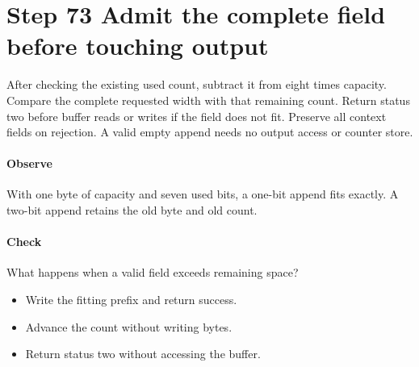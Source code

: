 \section{Step 73 Admit the complete field before touching output}\label{h263-writer-s03}
After checking the existing used count, subtract it from eight times capacity.
Compare the complete requested width with that remaining count. Return status
two before buffer reads or writes if the field does not fit. Preserve all context
fields on rejection. A valid empty append needs no output access or counter store.

\paragraph{Observe} With one byte of capacity and seven used bits, a one-bit
append fits exactly. A two-bit append retains the old byte and old count.
\paragraph{Check} What happens when a valid field exceeds remaining space?
\begin{itemize}
  \item[A.] Write the fitting prefix and return success.
  \item[B.] Advance the count without writing bytes.
  \item[C.] Return status two without accessing the buffer.
\end{itemize}
